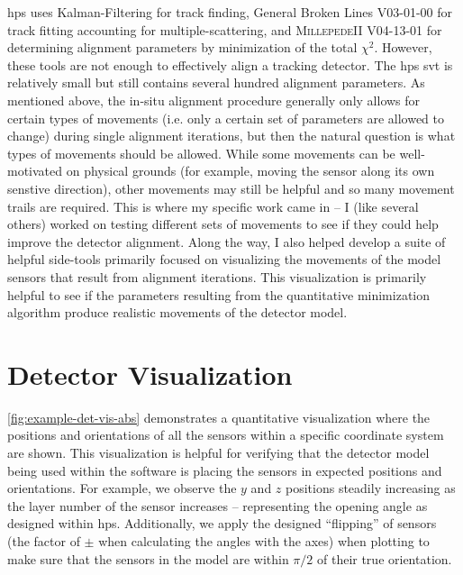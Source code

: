 \ac{hps} uses Kalman-Filtering for track finding,
General Broken Lines \cite{gbl-2012} V03-01-00 for track fitting accounting for multiple-scattering,
and \textsc{MillepedeII} \cite{millepede-2011} V04-13-01 for determining alignment parameters
by minimization of the total $\chi^2$.
However, these tools are not enough to effectively align a tracking detector.
The \ac{hps} \ac{svt} is relatively small but still contains several hundred alignment parameters.
As mentioned above, the in-situ alignment procedure generally only allows for certain types
of movements (i.e. only a certain set of parameters are allowed to change) during single
alignment iterations, but then the natural question is what types of movements should be allowed.
While some movements can be well-motivated on physical grounds (for example, moving the sensor
along its own senstive direction), other movements may still be helpful and so many movement trails
are required.
This is where my specific work came in -- I (like several others) worked on testing different
sets of movements to see if they could help improve the detector alignment.
Along the way, I also helped develop a suite of helpful side-tools primarily focused
on visualizing the movements of the model sensors that result from alignment iterations.
This visualization is primarily helpful to see if the parameters resulting from the quantitative
minimization algorithm produce realistic movements of the detector model.

\section{Detector Visualization}

\cref{fig:example-det-vis-abs} demonstrates a quantitative visualization where
the positions and orientations of all the sensors within a specific coordinate system are shown.
This visualization is helpful for verifying that the detector model being used within the software
is placing the sensors in expected positions and orientations. For example, we observe the $y$ and
$z$ positions steadily increasing as the layer number of the sensor increases -- representing the
opening angle as designed within \ac{hps}. Additionally, we apply the designed ``flipping'' of
sensors (the factor of $\pm$ when calculating the angles with the axes)
when plotting to make sure that the sensors in the model are within $\pi/2$ of their true orientation.

